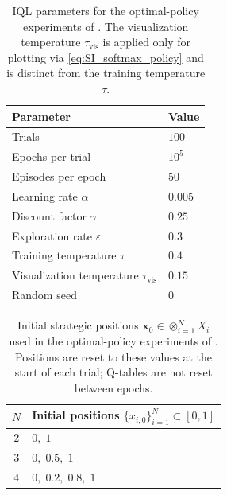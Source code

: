 \documentclass{article}
\begin{document}
            \begin{table}[ht!]
                \centering
                \caption{IQL parameters for the optimal-policy experiments of . The visualization temperature $\tau_{\mathrm{vis}}$ is applied only for plotting via \cref{eq:SI_softmax_policy} and is distinct from the training temperature $\tau$.}
                \label{tab:SI_optimal_policy_params}
                \begin{tabular}{ll}
                    \toprule
                    Parameter & Value \\
                    \midrule
                    Trials & $100$ \\
                    Epochs per trial & $10^5$ \\
                    Episodes per epoch & $50$ \\
                    Learning rate $\alpha$ & $0.005$ \\
                    Discount factor $\gamma$ & $0.25$ \\
                    Exploration rate $\varepsilon$ & $0.3$ \\
                    Training temperature $\tau$ & $0.4$ \\
                    Visualization temperature $\tau_{\mathrm{vis}}$ & $0.15$ \\
                    Random seed & $0$ \\
                    \bottomrule
                \end{tabular}
            \end{table}

            \begin{table}[ht!]
                \centering
                \caption{Initial strategic positions $\mathbf{x}_0 \in \otimes_{i=1}^N X_i$ used in the optimal-policy experiments of . Positions are reset to these values at the start of each trial; Q-tables are not reset between epochs.}
                \label{tab:SI_optimal_policy_init}
                \begin{tabular}{cl}
                    \toprule
                    $N$ & Initial positions $\{x_{i,0}\}_{i=1}^N \subset [0,1]$ \\
                    \midrule
                    $2$ & $0,\; 1$ \\
                    $3$ & $0,\; 0.5,\; 1$ \\
                    $4$ & $0,\; 0.2,\; 0.8,\; 1$ \\
                    \bottomrule
                \end{tabular}
            \end{table}
\end{document}

